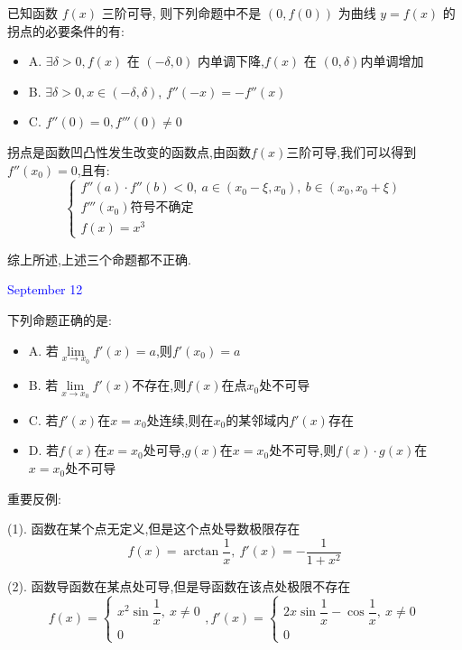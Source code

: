 \begin{example}[][Exam: 35.2.8]
	已知函数 $f(x)$ 三阶可导, 则下列命题中不是 $(0,f(0))$ 为曲线 $y=f(x)$ 的拐点的必要条件的有:  
\begin{itemize}
	\item A. $\exists \delta>0, f(x)$ 在 $(-\delta,0)$ 内单调下降,$f(x)$ 在 $(0,\delta)$内单调增加
	\item B. $\exists \delta>0, x\in(-\delta,\delta)$, $f''(-x)=-f''(x)$
	\item C. $f''(0)=0, f'''(0)\neq 0$
\end{itemize}
\end{example}

\begin{solution}

	拐点是函数凹凸性发生改变的函数点,由函数$f(x)$三阶可导,我们可以得到$f''(x_{0})=0$,且有:  
	$$\left\lbrace
	\begin{array}{l}
		f''(a)\cdot f''(b)<0,\ a\in(x_{0}-\xi,x_{0}),\ b\in(x_{0},x_{0}+\xi)\\
		f'''(x_{0})\text{符号不确定}\\
		f(x)=x^3
	\end{array}
	\right. $$
	
	综上所述,上述三个命题都不正确.
\end{solution}


\textcolor{blue}{September 12}

\begin{example}[][Exam: 35.2.9]
	下列命题正确的是:  
\begin{itemize}
	\item A. 若$\lim\limits_{x\to x_{0}}f'(x)=a$,则$f'(x_{0})=a$
	\item B. 若$\lim\limits_{x\to x_{0}}f'(x)$不存在,则$f(x)$在点$x_{0}$处不可导
	\item C. 若$f'(x)$在$x=x_{0}$处连续,则在$x_{0}$的某邻域内$f'(x)$存在
	\item D. 若$f(x)$在$x=x_{0}$处可导,$g(x)$在$x=x_{0}$处不可导,则$f(x)\cdot g(x)$在$x=x_{0}$处不可导
\end{itemize}
\end{example}
\begin{solution}

	重要反例:  
	
	(1). 函数在某个点无定义,但是这个点处导数极限存在
	$$f(x)=\arctan\dfrac{1}{x},\ f'(x)=-\dfrac{1}{1+x^2}$$
	
	(2). 函数导函数在某点处可导,但是导函数在该点处极限不存在
	$$f(x)=\left\lbrace
	\begin{array}{l}
		x^2\sin\dfrac{1}{x},\ x\neq 0\\
		0
	\end{array}
	\right. ,f'(x)=\left\lbrace
	\begin{array}{l}
		2x\sin\dfrac{1}{x}-\cos\dfrac{1}{x},\ x\neq 0\\
		0
	\end{array}
	\right. $$
\end{solution}

